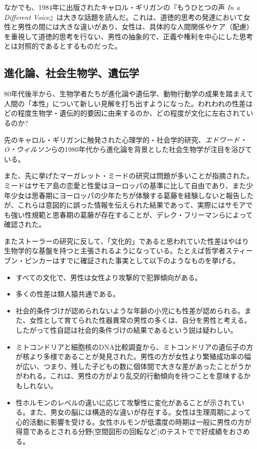 \documentclass[dvipdfmx,uplatex]{jsarticle}
\begin{document}
なかでも、1984年に出版されたキャロル・ギリガンの『もうひとつの声\emph{ In a Different Voice}』\citep{gilligan82:_in_differ_voice}は大きな話題を読んだ。これは、道徳的思考の発達において女性と男性の間には大きな違いがあり、女性は、具体的な人間関係やケア（配慮）を重視して道徳的思考を行ない、男性の抽象的で、正義や権利を中心にした思考とは対照的であるとするものだった。



\subsection{進化論、社会生物学、遺伝学}


80年代後半から、生物学者たちが進化論や遺伝学、動物行動学の成果を踏まえて人間の「本性」について新しい見解を打ち出すようになった。われわれの性差はどの程度生物学・遺伝的的要因に由来するのか、どの程度が文化に左右されているのか?

先のキャロル・ギリガンに触発された心理学的・社会学的研究、\emph{エドワード・O・ウィルソン}らの1980年代から進化論を背景とした社会生物学が注目を浴びている。

また、先に挙げたマーガレット・ミードの研究は問題が多いことが指摘された。ミードはサモア島の恋愛と性愛はヨーロッパの基準に比して自由であり、また少年少女は思春期にヨーロッパの少年たちが体験する葛藤を経験しないと報告したが、これらは意図的に誤った情報を伝えられた結果であって、実際にはサモアでも強い性規範と思春期の葛藤が存在することが、デレク・フリーマン\citep{freeman83:_margar_mead_and_samoa}らによって確認された。

またストーラーの研究に反して、「文化的」であると思われていた性差はやはり生物学的な基盤を持つと主張されるようになっている。たとえば哲学者スティーブン・ピンカーはすでに確証された事実として以下のようなものを挙げる\citep{pinker02:_blank_slate}。

\begin{itemize}

\item すべての文化で、男性は女性より攻撃的で犯罪傾向がある。

\item 多くの性差は類人猿共通である。

\item 社会的条件づけが認められないような年齢の小児にも性差が認められる。また、女性として育てられた性器異常の男性の多くは、自分を男性と考える。したがって性自認は社会的条件づけの結果であるという説は疑わしい。

\item ミトコンドリアと細胞核のDNA比較調査から、ミトコンドリアの遺伝子の方が核より多様であることが発見された。男性の方が女性より繁殖成功率の幅が広い、つまり、残した子どもの数に個体間で大きな差があったことがうかがわれる。これは、男性の方がより乱交的行動傾向を持つことを意味するかもしれない。

\item 性ホルモンのレベルの違いに応じて攻撃性に変化があることが示されている。また、男女の脳には構造的な違いが存在する。女性は生理周期によって心的活動に影響を受ける。女性ホルモンが低濃度の時期は一般に男性の方が得意であるとされる分野(空間図形の回転など)のテストでで好成績をおさめる。

\end{itemize}
\end{document}
